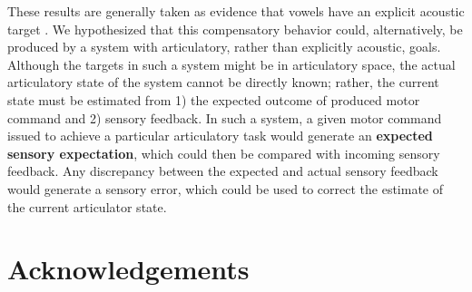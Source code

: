\documentclass[a4paper]{article}
\begin{document}
  These results are generally taken as evidence that vowels have an explicit acoustic target \cite{PERRIER2015}. We hypothesized that this compensatory behavior could, alternatively, be produced by a system with articulatory, rather than explicitly acoustic, goals. Although the targets in such a system might be in articulatory space, the actual articulatory state of the system cannot be directly known; rather, the current state must be estimated from 1) the expected outcome of produced motor command and 2) sensory feedback. In such a system, a given motor command issued to achieve a particular articulatory task would generate an \textbf{expected sensory expectation}, which could then be compared with incoming sensory feedback. Any discrepancy between the expected and actual sensory feedback would generate a sensory error, which could be used to correct the estimate of the current articulator state. 
  
  
  \section{Acknowledgements}
  


  \newpage
  \eightpt
  
  
\end{document}
